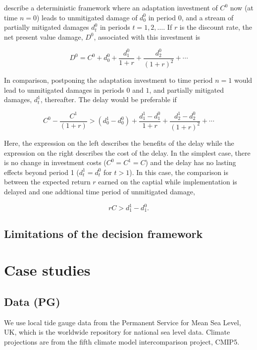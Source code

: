 \documentclass[wrr, draft]{agutex}
\begin{document}
\begin{article}
\cite{Fankhauser&1999} describe a deterministic framework where an adaptation investment of $C^0$ now (at time $n=0$) leads to unmitigated damage of $d_0^0$ in period $0$, and a stream of partially mitigated damages $d_t^0$ in periods $t=1,2,\ldots$. If $r$ is the discount rate, the net present value damage, $D^0$, associated with this investment is
\begin{linenomath*}
\begin{equation}\label{eq:deterministic damage}
D^0 = C^0 + d_0^0 + \frac{d_1^0}{1+r} + \frac{d_2^0}{(1+r)^2} + \cdots  
\end{equation}
\end{linenomath*}
In comparison, postponing the adaptation investment to time period $n=1$ would lead to unmitigated damages in periods $0$ and $1$, and partially mitigated damages, $d_t^1$, thereafter. The delay would be preferable if
\begin{linenomath*}
\[
C^0 - \frac{C^1}{(1+r)} > (d_0^1 - d_0^0) + \frac{d_1^1 - d_1^0}{1+r} + \frac{d_2^1 - d_2^0}{(1+r)^2} + \cdots
\]
\end{linenomath*}
Here, the expression on the left describes the benefits of the delay while the expression on the right describes the cost of the delay. In the simplest case, there is no change in investment costs ($C^0 = C^1 = C$) and the delay has no lasting effects beyond period 1 ($d_t^1 = d_t^0$ for $t > 1$). In this case, the comparison is between the expected return $r$ earned on the captial while implementation is delayed and one addtional time period of unmitigated damage,
\begin{linenomath*}
  \[
  r C > d_1^1 - d_1^0.
  \]
  \end{linenomath*}

\subsection{Limitations of the decision framework}

\section{Case studies}

\subsection{Data {\color{blue} (PG)}}
We use local tide gauge data from the Permanent Service for Mean Sea Level, UK, which is the worldwide repository for national sea level data. Climate projections are from the fifth climate model intercomparison project, CMIP5. 


\end{article}
\end{document}
